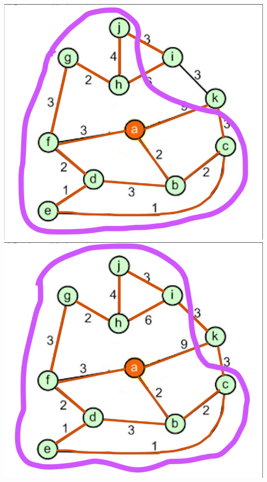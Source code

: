 \documentclass[a4paper]{exam}
\begin{document}
\begin{questions}
\begin{parts}
\begin{solution}
    \includegraphics[scale=0.2]{Q3/images3b/3b9}
    \includegraphics[scale=0.2]{Q3/images3b/3b10}

\end{solution}
\end{parts}
\end{questions}
\end{document}
